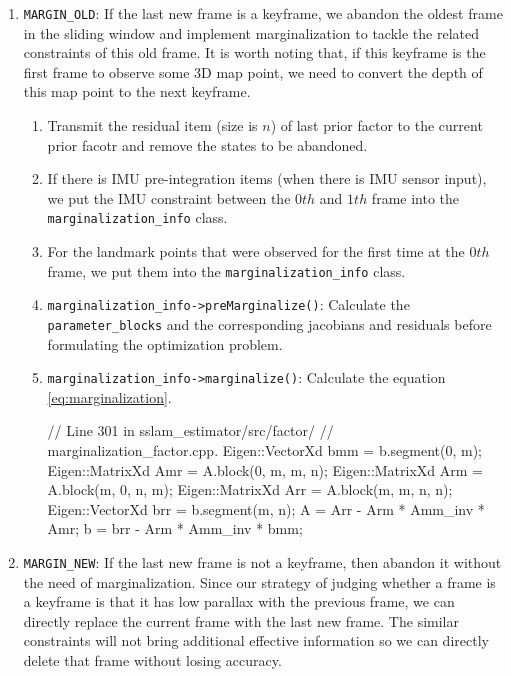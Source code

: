 \documentclass[12pt]{report}   %
\begin{document}
\begin{enumerate}
	\item \verb|MARGIN_OLD|: If the last new frame is a keyframe, we abandon the oldest frame in the sliding window and implement marginalization to tackle the related constraints of this old frame. It is worth noting that, if this keyframe is the first frame to observe some 3D map point, we need to convert the depth of this map point to the next keyframe.
	
	\begin{enumerate}
		\item Transmit the residual item (size is $n$) of last prior factor to the current prior facotr and remove the states to be abandoned.
		\item If there is IMU pre-integration items (when there is IMU sensor input), we put the IMU constraint between the $0th$ and $1th$ frame into the \verb|marginalization_info| class.
		\item For the landmark points that were observed for the first time at the $0th$ frame, we put them into the \verb|marginalization_info| class.
		\item \verb|marginalization_info->preMarginalize()|: Calculate the \verb|parameter_blocks| and the corresponding jacobians and residuals before formulating the optimization problem.
		\item \verb|marginalization_info->marginalize()|: Calculate the equation \eqref{eq:marginalization}.
		
\begin{cppcode}
// Line 301 in sslam\_estimator/src/factor/
// marginalization\_factor.cpp. 
Eigen::VectorXd bmm = b.segment(0, m);
Eigen::MatrixXd Amr = A.block(0, m, m, n);
Eigen::MatrixXd Arm = A.block(m, 0, n, m);
Eigen::MatrixXd Arr = A.block(m, m, n, n);
Eigen::VectorXd brr = b.segment(m, n);
A = Arr - Arm * Amm_inv * Amr;
b = brr - Arm * Amm_inv * bmm;
\end{cppcode}
		
	\end{enumerate}
	
	
	\item \verb|MARGIN_NEW|: If the last new frame is not a keyframe, then abandon it without the need of marginalization. Since our strategy of judging whether a frame is a keyframe is that it has low parallax with the previous frame, we can directly replace the current frame with the last new frame. The similar constraints will not bring additional effective information so we can directly delete that frame without losing accuracy. 
	
\end{enumerate}
\end{document}
